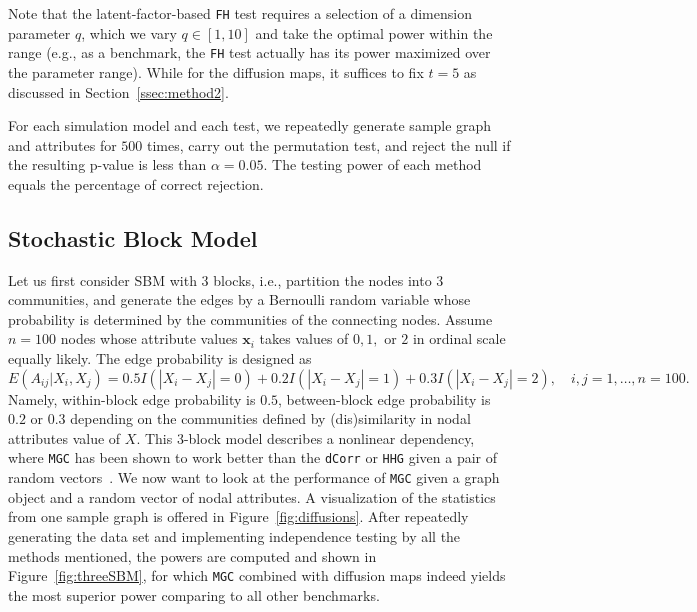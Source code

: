 \documentclass[11pt]{article}
\theoremstyle{definition}
\begin{document}
	Note that the latent-factor-based \texttt{FH} test requires a selection of a dimension parameter $q$, which we vary $q \in [1,10]$ and take the optimal power within the range (e.g., as a benchmark, the \texttt{FH} test actually has its power maximized over the parameter range). While for the diffusion maps, it suffices to fix $t=5$ as discussed in Section~\ref{ssec:method2}.
	
	For each simulation model and each test, we repeatedly generate sample graph and attributes for $500$ times, carry out the permutation test, and reject the null if the resulting p-value is less than $\alpha = 0.05$. The testing power of each method equals the percentage of correct rejection. 
	
	\subsection{Stochastic Block Model}
	
	Let us first consider SBM with $3$ blocks, i.e., partition the nodes into $3$ communities, and generate the edges by a Bernoulli random variable whose probability is determined by the communities of the connecting nodes. Assume $n=100$ nodes whose attribute values $\mathbf{x}_i$ takes values of $0,1,$ or $2$ in ordinal scale equally likely. The edge probability is designed as
	\begin{equation}
	\label{eq:Three}
	E(A_{ij} | X_{i}, X_{j}) = 0.5 I(|X_{i} - X_{j}| = 0) + 0.2 I(|X_{i} - X_{j}| = 1) + 0.3 I(|X_{i} - X_{j}| = 2), \quad i,j = 1, \ldots, n = 100.
	\end{equation} 
	Namely, within-block edge probability is $0.5$, between-block edge probability is $0.2$ or $0.3$ depending on the communities defined by (dis)similarity in nodal attributes value of $X$. This 3-block model describes a nonlinear dependency, where \texttt{MGC} has been shown to work better than the \texttt{dCorr} or \texttt{HHG} given a pair of random vectors~\cite{shen2016discovering}. We now want to look at the performance of \texttt{MGC} given a graph object and a random vector of nodal attributes. A visualization of the statistics from one sample graph is offered in Figure~\ref{fig:diffusions}. After repeatedly generating the data set and implementing independence testing by all the methods mentioned, the powers are computed and shown in Figure~\ref{fig:threeSBM}, for which \texttt{MGC} combined with diffusion maps indeed yields the most superior power comparing to all other benchmarks.
	
\end{document}

